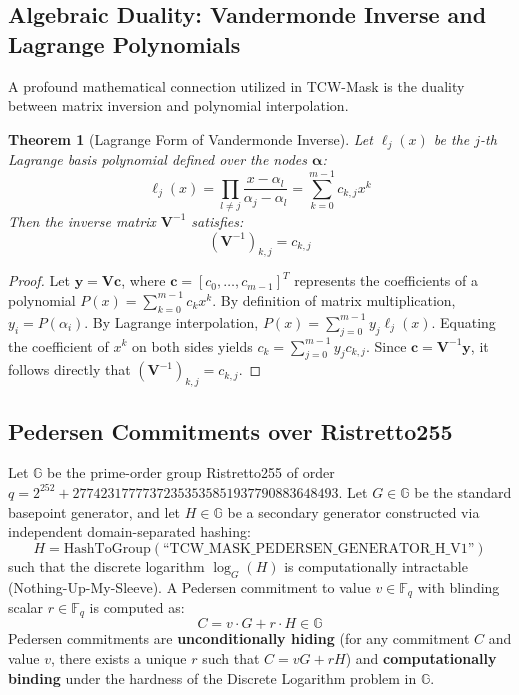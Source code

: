 \documentclass[10pt,journal,compsoc]{IEEEtran}
\newtheorem{theorem}{Theorem}
\begin{document}
\subsection{Algebraic Duality: Vandermonde Inverse and Lagrange Polynomials}
A profound mathematical connection utilized in TCW-Mask is the duality between matrix inversion and polynomial interpolation.
\begin{theorem}[Lagrange Form of Vandermonde Inverse]
Let $\ell_j(x)$ be the $j$-th Lagrange basis polynomial defined over the nodes $\boldsymbol{\alpha}$:
\begin{equation}
\ell_j(x) = \prod_{l \ne j} \frac{x - \alpha_l}{\alpha_j - \alpha_l} = \sum_{k=0}^{m-1} c_{k, j} x^k
\end{equation}
Then the inverse matrix $\mathbf{V}^{-1}$ satisfies:
\begin{equation}
(\mathbf{V}^{-1})_{k, j} = c_{k, j}
\end{equation}
\end{theorem}
\begin{proof}
Let $\mathbf{y} = \mathbf{V} \mathbf{c}$, where $\mathbf{c} = [c_0, \dots, c_{m-1}]^T$ represents the coefficients of a polynomial $P(x) = \sum_{k=0}^{m-1} c_k x^k$. By definition of matrix multiplication, $y_i = P(\alpha_i)$. By Lagrange interpolation, $P(x) = \sum_{j=0}^{m-1} y_j \ell_j(x)$. Equating the coefficient of $x^k$ on both sides yields $c_k = \sum_{j=0}^{m-1} y_j c_{k, j}$. Since $\mathbf{c} = \mathbf{V}^{-1} \mathbf{y}$, it follows directly that $(\mathbf{V}^{-1})_{k, j} = c_{k, j}$.
\end{proof}

\subsection{Pedersen Commitments over Ristretto255}
Let $\mathbb{G}$ be the prime-order group Ristretto255 of order $q = 2^{252} + 27742317777372353535851937790883648493$. Let $G \in \mathbb{G}$ be the standard basepoint generator, and let $H \in \mathbb{G}$ be a secondary generator constructed via independent domain-separated hashing:
\begin{equation}
H = \text{HashToGroup}(\text{``TCW\_MASK\_PEDERSEN\_GENERATOR\_H\_V1''})
\end{equation}
such that the discrete logarithm $\log_G(H)$ is computationally intractable (Nothing-Up-My-Sleeve).
A Pedersen commitment to value $v \in \mathbb{F}_q$ with blinding scalar $r \in \mathbb{F}_q$ is computed as:
\begin{equation}
C = v \cdot G + r \cdot H \in \mathbb{G}
\end{equation}
Pedersen commitments are \textbf{unconditionally hiding} (for any commitment $C$ and value $v$, there exists a unique $r$ such that $C = vG + rH$) and \textbf{computationally binding} under the hardness of the Discrete Logarithm problem in $\mathbb{G}$.
\end{document}
